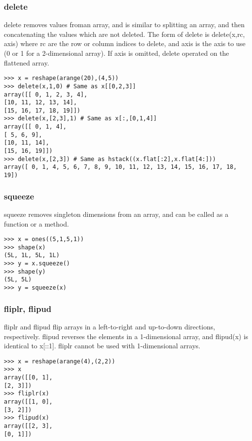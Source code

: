 \subsubsection{delete}
delete removes values froman array, and is similar to splitting an array, and then concatenating the values
which are not deleted. The form of delete is delete(x,rc, axis) where rc are the row or column indices to
delete, and axis is the axis to use (0 or 1 for a 2-dimensional array). If axis is omitted, delete operated on
the flattened array.
\begin{framed}
\begin{verbatim}
>>> x = reshape(arange(20),(4,5))
>>> delete(x,1,0) # Same as x[[0,2,3]]
array([[ 0, 1, 2, 3, 4],
[10, 11, 12, 13, 14],
[15, 16, 17, 18, 19]])
>>> delete(x,[2,3],1) # Same as x[:,[0,1,4]]
array([[ 0, 1, 4],
[ 5, 6, 9],
[10, 11, 14],
[15, 16, 19]])
>>> delete(x,[2,3]) # Same as hstack((x.flat[:2],x.flat[4:]))
array([ 0, 1, 4, 5, 6, 7, 8, 9, 10, 11, 12, 13, 14, 15, 16, 17, 18,
19])
\end{verbatim}
\end{framed}
\subsubsection{squeeze}
squeeze removes singleton dimensions from an array, and can be called as a function or a method.
\begin{framed}
\begin{verbatim}
>>> x = ones((5,1,5,1))
>>> shape(x)
(5L, 1L, 5L, 1L)
>>> y = x.squeeze()
>>> shape(y)
(5L, 5L)
>>> y = squeeze(x)
\end{verbatim}
\end{framed}
\subsubsection{fliplr, flipud}
fliplr and flipud flip arrays in a left-to-right and up-to-down directions, respectively. flipud reverses
the elements in a 1-dimensional array, and flipud(x) is identical to x[::1].
fliplr cannot be used with 1-dimensional arrays.
\begin{framed}
\begin{verbatim}
>>> x = reshape(arange(4),(2,2))
>>> x
array([[0, 1],
[2, 3]])
>>> fliplr(x)
array([[1, 0],
[3, 2]])
>>> flipud(x)
array([[2, 3],
[0, 1]])
\end{verbatim}
\end{framed}
